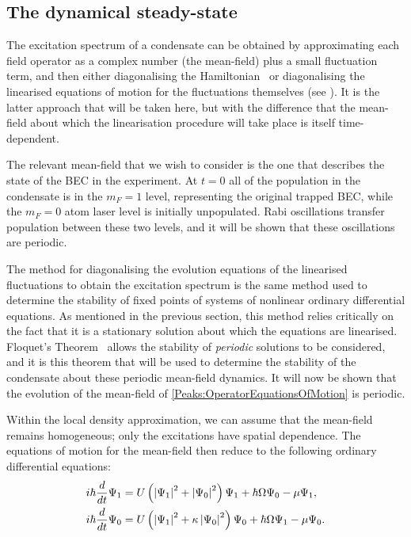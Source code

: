 \subsection{The dynamical steady-state}
\label{Peaks:MeanFieldPeriodicity}

The excitation spectrum of a condensate can be obtained by approximating each field operator as a complex number (the mean-field) plus a small fluctuation term, and then either diagonalising the Hamiltonian~\cite{Bogoliubov:1947,FetterWalecka} or diagonalising the linearised equations of motion for the fluctuations themselves (see ). It is the latter approach that will be taken here, but with the difference that the mean-field about which the linearisation procedure will take place is itself time-dependent.

The relevant mean-field that we wish to consider is the one that describes the state of the BEC in the experiment. At $t=0$ all of the population in the condensate is in the $m_F=1$ level, representing the original trapped BEC, while the $m_F=0$ atom laser level is initially unpopulated. Rabi oscillations transfer population between these two levels, and it will be shown that these oscillations are periodic.

The method for diagonalising the evolution equations of the linearised fluctuations to obtain the excitation spectrum is the same method used to determine the stability of fixed points of systems of nonlinear ordinary differential equations. As mentioned in the previous section, this method relies critically on the fact that it is a stationary solution about which the equations are linearised. Floquet's Theorem~\citep{AppliedNonlinearDynamics} allows the stability of \emph{periodic} solutions to be considered, and it is this theorem that will be used to determine the stability of the condensate about these periodic mean-field dynamics. It will now be shown that the evolution of the mean-field of \eqref{Peaks:OperatorEquationsOfMotion} is periodic.

Within the local density approximation, we can assume that the mean-field remains homogeneous; only the excitations have spatial dependence. The equations of motion for the mean-field then reduce to the following ordinary differential equations:
\begin{subequations}
    \label{Peaks:MeanFieldEquationsOfMotion}
    \begin{align}
    i \hbar \frac{d }{dt}\Psi_1 &= U\left(\abs{\Psi_1}^2 + \abs{\Psi_0}^2\right)\Psi_1 + \hbar \Omega \Psi_0 - \mu \Psi_1,\\
    i \hbar \frac{d }{dt}\Psi_0 &= U\left(\abs{\Psi_1}^2 + \kappa \abs{\Psi_0}^2\right)\Psi_0 + \hbar \Omega \Psi_1 - \mu \Psi_0.
    \end{align}
\end{subequations}

